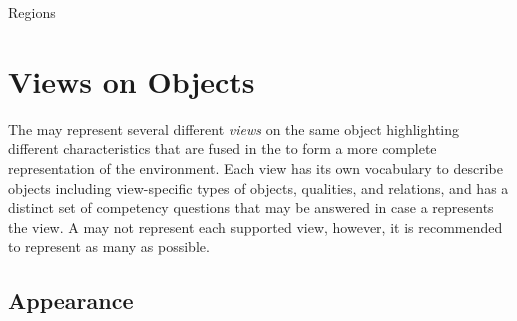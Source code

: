 \begin{ODP}{Regions}
\end{ODP}

\section{Views on Objects}
\label{sec:background:views}

The \neembak may represent several different \emph{views} on the same object highlighting different characteristics that are fused in the \neembak to form a more complete representation of the environment.
Each view has its own vocabulary to describe objects including view-specific types of objects, qualities, and relations, and has a distinct set of competency questions that may be answered in case a \neem represents the view.
A \neem may not represent each supported view, however, it is recommended to represent as many as possible.

\subsection{Appearance}


\lipsum[2]

